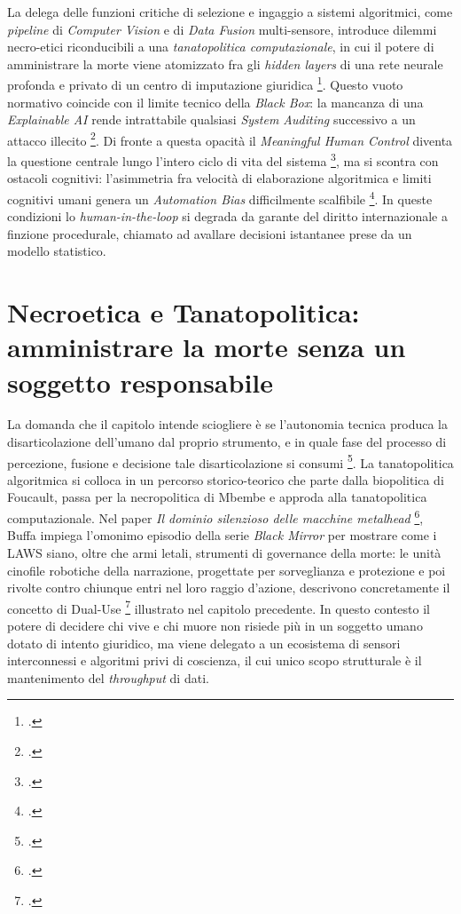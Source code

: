 \documentclass[a4paper,12pt]{report}
\begin{document}
La delega delle funzioni critiche di selezione e ingaggio a sistemi algoritmici,
come \textit{pipeline} di \textit{Computer Vision} e di \textit{Data Fusion}
multi-sensore, introduce dilemmi necro-etici riconducibili a una
\textit{tanatopolitica computazionale}, in cui il potere di amministrare la morte
viene atomizzato fra gli \textit{hidden layers} di una rete neurale profonda e
privato di un centro di imputazione giuridica \footcite{buffa_2025}. Questo vuoto
normativo coincide con il limite tecnico della \textit{Black Box}: la mancanza di
una \textit{Explainable AI} rende intrattabile qualsiasi \textit{System Auditing}
successivo a un attacco illecito \footcite{wood_2024_xai, christie_2024}. Di
fronte a questa opacità il \textit{Meaningful Human Control} diventa la questione
centrale lungo l'intero ciclo di vita del sistema
\footcite{bode_2025, christie_2024}, ma si scontra con ostacoli cognitivi:
l'asimmetria fra velocità di elaborazione algoritmica e limiti cognitivi umani
genera un \textit{Automation Bias} difficilmente scalfibile
\footcite{horowitz_kahn_2024}. In queste condizioni lo \textit{human-in-the-loop}
si degrada da garante del diritto internazionale a finzione procedurale, chiamato
ad avallare decisioni istantanee prese da un modello statistico.

\section{Necroetica e Tanatopolitica: amministrare la morte senza un soggetto responsabile}

La domanda che il capitolo intende sciogliere è se l'autonomia tecnica produca la
disarticolazione dell'umano dal proprio strumento, e in quale fase del processo
di percezione, fusione e decisione tale disarticolazione si consumi
\footcite{buffa_2025}. La tanatopolitica algoritmica si colloca in un percorso
storico-teorico che parte dalla biopolitica di Foucault, passa per la
necropolitica di Mbembe e approda alla tanatopolitica computazionale. Nel paper
\textit{Il dominio silenzioso delle macchine metalhead} \footcite{buffa_2025},
Buffa impiega l'omonimo episodio della serie \textit{Black Mirror} per mostrare
come i LAWS siano, oltre che armi letali, strumenti di governance della morte: le
unità cinofile robotiche della narrazione, progettate per sorveglianza e
protezione e poi rivolte contro chiunque entri nel loro raggio d'azione,
descrivono concretamente il concetto di Dual-Use \footcite{longpre_2022}
illustrato nel capitolo precedente. In questo contesto il potere di decidere chi
vive e chi muore non risiede più in un soggetto umano dotato di intento
giuridico, ma viene delegato a un ecosistema di sensori interconnessi e algoritmi
privi di coscienza, il cui unico scopo strutturale è il mantenimento del
\textit{throughput} di dati.
\end{document}

